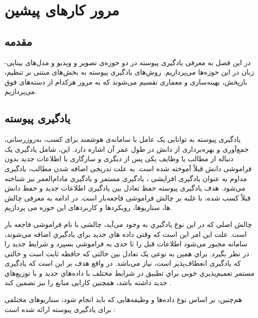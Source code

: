 \chapter{مرور کارهای پیشین}
\section{مقدمه}
در این فصل به معرفی یادگیری پیوسته در دو حوزه‌ی تصویر و ویدیو و مدل‌های بینایی-زبان در این حوزه‌ها می‌پردازیم. روش‌های یادگیری پیوسته به بخش‌های مبتنی بر تنظیم، بازپخش، بهینه‌سازی و معماری تقسیم می‌شوند که به مرور هرکدام از دسته‌های فوق می‌پردازیم. 

\section{یادگیری پیوسته}
یادگیری پیوسته به توانایی یک عامل یا سامانه‌ی هوشمند برای کسب، به‌روزرسانی، جمع‌آوری و بهره‌برداری از دانش در طول عمر آن اشاره دارد. این، شامل یادگیری یک دنباله از مطالب یا وظایف یکی پس از دیگری و سازگاری با اطلاعات جدید بدون فراموشی دانش قبلاً آموخته شده است. به علت تدریجی اضافه شدن مطالب، یادگیری مداوم به عنوان یادگیری افزایشی ، یادگیری مستمر  و یادگیری مادام‌العمر  نیز شناخته می‌شود. هدف یادگیری پیوسته حفظ تعادل بین یادگیری اطلاعات جدید و حفظ دانش قبلاً کسب شده، با غلبه بر چالش فراموشی فاجعه‌بار است. در ادامه به معرفی چالش ها، سناریوها، رویکردها و کاربردهای این حوزه می پردازیم.


چالش اصلی که در این نوع یادگیري به وجود می‌آید، چالشی با نام فراموشی فاجعه بار است. علت این امر این است که وقتی داده هاي جدید براي یادگیري اضافه می‌شوند، سامانه مجبور می‌شود اطلاعات قبل را تا حدی به فراموشی بسپرد و شرایط جدید را در نظر بگیرد. براي همین به نوعی یک تعادل بین حالتی که حافظه ثابت است و حالتی که یادگیری انعطاف‌پذیر است، نیاز می‌باشد. در واقع هدف بر این است که یادگیری مستمر تعمیم‌پذیري خوبی براي تطبیق در شرایط مختلف با داده‌هاي جدید و با توزیع‌هاي جدید داشته باشد، همچنین کارایی منابع را نیز تضمین کند 
\cite{1, 2}
.

هم‌چنین، بر اساس نوع داده‌ها و وظیفه‌هایی که باید انجام شود، سناریوهای مختلفی برای یادگیری پیوسته ارائه شده است 
\cite{1}:

